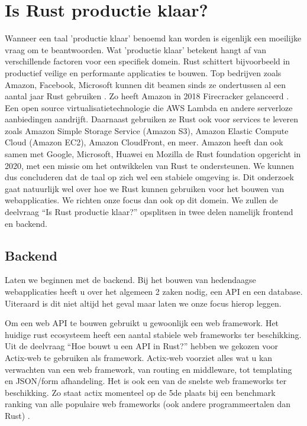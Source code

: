 \clearpage

\section{Is Rust productie klaar?}
\label{productie}

Wanneer een taal 'productie klaar' benoemd kan worden is eigenlijk een moeilijke vraag om te
beantwoorden. Wat 'productie klaar' betekent hangt af van verschillende factoren voor een specifiek
domein. Rust schittert bijvoorbeeld in productief veilige en performante applicaties te bouwen. Top
bedrijven zoals Amazon, Facebook, Microsoft kunnen dit beamen sinds ze ondertussen al een aantal jaar
Rust gebruiken \cite{rust_companies}. Zo heeft Amazon in 2018 Firecracker gelanceerd
\cite{aws_sustainability}. Een open source virtualisatietechnologie die AWS Lambda en andere
serverloze aanbiedingen aandrijft. Daarnaast gebruiken ze Rust ook voor services te leveren zoals
Amazon Simple Storage Service (Amazon S3), Amazon Elastic Compute Cloud (Amazon EC2), Amazon
CloudFront, en meer. Amazon heeft dan ook samen met Google, Microsoft, Huawei en Mozilla de Rust
foundation opgericht in 2020, met een missie om het ontwikkelen van Rust te ondersteunen. We kunnen
dus concluderen dat de taal op zich wel een stabiele omgeving is. Dit onderzoek gaat natuurlijk wel
over hoe we Rust kunnen gebruiken voor het bouwen van webapplicaties. We richten onze focus dan ook
op dit domein. We zullen de deelvraag “Is Rust productie klaar?” opsplitsen in twee delen namelijk
frontend en backend. 

\subsection{Backend }

Laten we beginnen met de backend. Bij het bouwen van hedendaagse webapplicaties heeft u over het
algemeen 2 zaken nodig, een API en een database. Uiteraard is dit niet altijd het geval maar laten
we onze focus hierop leggen. 

Om een web API te bouwen gebruikt u gewoonlijk een web framework. Het huidige rust ecosysteem heeft
een aantal stabiele web frameworks ter beschikking. Uit de deelvraag “Hoe bouwt u een API in
Rust?” hebben we gekozen voor Actix-web te gebruiken als framework. Actix-web voorziet alles wat u
kan verwachten van een web framework, van routing en middleware, tot templating en JSON/form
afhandeling. Het is ook een van de snelste web frameworks ter beschikking. Zo staat actix momenteel
op de 5de plaats bij een benchmark ranking van alle populaire web frameworks (ook andere
programmeertalen dan Rust) \cite{web_bench}. 

